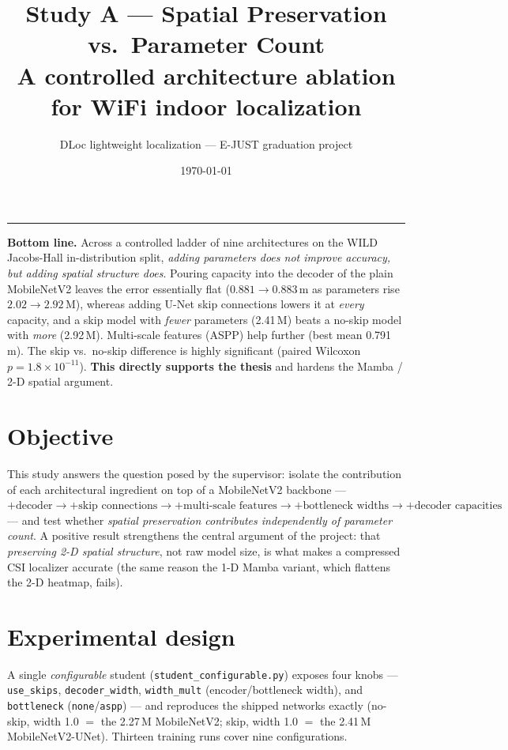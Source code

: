 \documentclass[11pt]{article}
\title{\textbf{Study A — Spatial Preservation vs.\ Parameter Count}\\[2pt]
\large A controlled architecture ablation for WiFi indoor localization}
\author{DLoc lightweight localization --- E-JUST graduation project}
\date{\today}
\begin{document}
\maketitle
\vspace{-1.1em}\hrule\vspace{1em}

\textbf{Bottom line.} Across a controlled ladder of nine architectures on the WILD
Jacobs-Hall in-distribution split, \emph{adding parameters does not improve accuracy, but
adding spatial structure does}. Pouring capacity into the decoder of the plain
MobileNetV2 leaves the error essentially flat ($0.881\!\to\!0.883$\,m as parameters rise
$2.02\!\to\!2.92$\,M), whereas adding U-Net skip connections lowers it at \emph{every}
capacity, and a skip model with \emph{fewer} parameters (2.41\,M) beats a no-skip model
with \emph{more} (2.92\,M). Multi-scale features (ASPP) help further (best mean 0.791\,m).
The skip vs.\ no-skip difference is highly significant (paired Wilcoxon $p=1.8\times10^{-11}$).
\textbf{This directly supports the thesis} and hardens the Mamba / 2-D spatial argument.

\section{Objective}
This study answers the question posed by the supervisor: isolate the contribution of each
architectural ingredient on top of a MobileNetV2 backbone ---
$+\text{decoder}\to+\text{skip connections}\to+\text{multi-scale features}\to
+\text{bottleneck widths}\to+\text{decoder capacities}$ --- and test whether
\emph{spatial preservation contributes independently of parameter count}. A positive result
strengthens the central argument of the project: that \emph{preserving 2-D spatial structure},
not raw model size, is what makes a compressed CSI localizer accurate (the same reason the
1-D Mamba variant, which flattens the 2-D heatmap, fails).

\section{Experimental design}
A single \emph{configurable} student (\texttt{student\_configurable.py}) exposes four knobs ---
\texttt{use\_skips}, \texttt{decoder\_width}, \texttt{width\_mult} (encoder/bottleneck width),
and \texttt{bottleneck} (\texttt{none}/\texttt{aspp}) --- and reproduces the shipped networks
exactly (no-skip, width 1.0 $=$ the 2.27\,M MobileNetV2; skip, width 1.0 $=$ the 2.41\,M
MobileNetV2-UNet). Thirteen training runs cover nine configurations.
\end{document}
